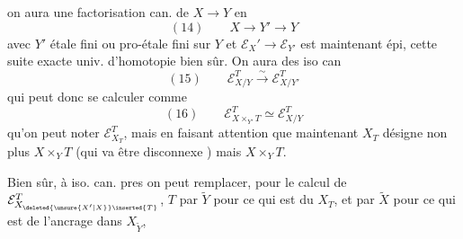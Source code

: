 

on aura une factorisation can. de $X\longrightarrow Y$ en
\[
(14)\qquad X\longrightarrow Y'\longrightarrow Y
\]
avec $Y'$ étale fini ou pro-étale fini sur $Y$ et $\mathcal E_X'\longrightarrow\mathcal E_{Y'}$ est maintenant épi,  cette suite exacte univ. d'homotopie bien sûr. On aura des iso can
\[
(15)\qquad \mathcal E_{X/Y}^T\xrightarrow{\sim}\mathcal E_{X/Y'}^T
\]
qui peut donc se calculer comme
\[
(16)\qquad \mathcal E_{X\times_{Y'}T}^T\simeq\mathcal E_{X/Y}^T
\]
qu'on peut noter $\mathcal E_{X_T}^T$, mais en faisant attention que maintenant $X_T$ désigne non plus $X\times_YT$ (qui va être disconnexe ) mais $X\times_YT$.

Bien sûr, à iso. can. pres on peut  remplacer, pour le calcul de $\mathcal E_{X_{\deleted{\unsure{X'|X}}\inserted{T}}}^T$, $T$ par $\widetilde Y$ pour ce qui est du $X_T$, et par $\widetilde X$ pour ce qui est de l'ancrage dans $X_{\widetilde Y}$,

